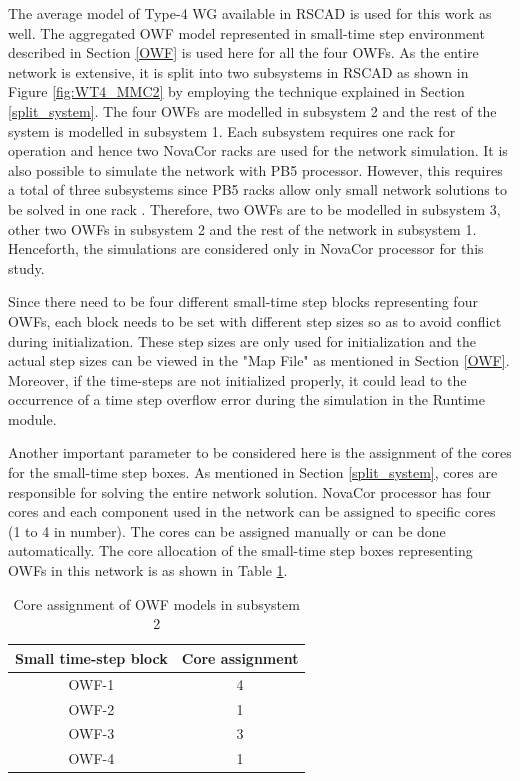 The average model of Type-4 \gls{WG} available in RSCAD is used for this work as well. The aggregated \gls{OWF} model represented in small-time step environment described in Section \ref{OWF} is used here for all the four \gls{OWF}s. As the entire network is extensive, it is split into two subsystems in RSCAD as shown in Figure \ref{fig:WT4_MMC2} by employing the technique explained in Section \ref{split_system}. The four \gls{OWF}s are modelled in subsystem 2 and the rest of the system is modelled in subsystem 1. Each subsystem requires one rack for operation and hence two NovaCor racks are used for the network simulation. It is also possible to simulate the network with PB5 processor. However, this requires a total of three subsystems since PB5 racks allow only small network solutions to be solved in one rack \cite{noauthor_pb5_nodate}. Therefore, two \gls{OWF}s are to be modelled in subsystem 3, other two \gls{OWF}s in subsystem 2 and the rest of the network in subsystem 1. Henceforth, the simulations are considered only in NovaCor processor for this study.  


Since there need to be four different small-time step blocks representing four \gls{OWF}s, each block needs to be set with different step sizes so as to avoid conflict during initialization. These step sizes are only used for initialization and the actual step sizes can be viewed in the "Map File" as mentioned in Section \ref{OWF}. Moreover, if the time-steps are not initialized properly, it could lead to the occurrence of a time step overflow error during the simulation in the Runtime module. 


Another important parameter to be considered here is the assignment of the cores for the small-time step boxes. As mentioned in Section \ref{split_system}, cores are responsible for solving the entire network solution. NovaCor processor has four cores and each component used in the network can be assigned to specific cores (1 to 4 in number). The cores can be assigned manually or can be done automatically. The core allocation of the small-time step boxes representing \gls{OWF}s in this network is as shown in Table \ref{tab:Core_assignment_sub2}.  

   

\begin{table}[H]
\centering
\begin{tabular}{|c|c|}
\hline
\textbf{Small time-step block} & \textbf{Core assignment} \\ \hline
OWF-1                          & 4                        \\ \hline
OWF-2                          & 1                        \\ \hline
OWF-3                          & 3                        \\ \hline
OWF-4                          & 1                        \\ \hline
\end{tabular}
\caption{Core assignment of OWF models in subsystem 2}
\label{tab:Core_assignment_sub2}
\end{table}

